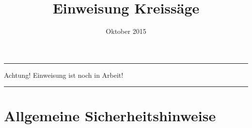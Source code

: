 \documentclass{\basedir/fablab-document}
\date{Oktober 2015}
\author{}
\title{Einweisung Kreissäge}
\begin{document}
\dosecttoc
\faketableofcontents
{}

\color{red}
\hrule
\begin{center}
\large{Achtung! Einweisung ist noch in Arbeit!}
\vspace{0.1cm}
\end{center}
\hrule
\color{black}

\section[Allgemeine Sicherheitshinweise]{Allgemeine Sicherheitshinweise}
\end{document}
